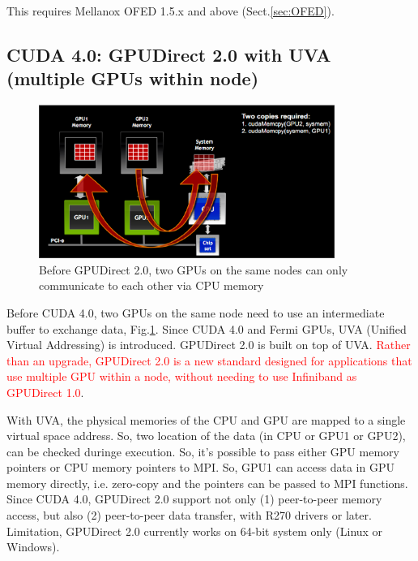 This requires Mellanox OFED 1.5.x and above (Sect.\ref{sec:OFED}).

\subsection{CUDA 4.0: GPUDirect 2.0 with UVA (multiple GPUs within node)}
\label{sec:GPUs_GPUDirect2}
\label{sec:GPUDirect-v2}

\begin{figure}[hbt]
  \centerline{\includegraphics[height=5cm,
    angle=0]{./images/GPUDirect1.eps}}
\caption{Before GPUDirect 2.0, two GPUs on the same nodes can only communicate
to each other via CPU memory}
\label{fig:2GPU_communicate}
\end{figure}

Before CUDA 4.0, two GPUs on the same node need to use an intermediate buffer to
exchange data, Fig.\ref{fig:2GPU_communicate}. Since CUDA 4.0 and Fermi GPUs,
UVA (Unified Virtual Addressing) is introduced. GPUDirect 2.0 is built on top of UVA.
\textcolor{red}{Rather than an upgrade, GPUDirect 2.0 is a new standard designed
for applications that use multiple GPU within a node, without needing to use
Infiniband as GPUDirect 1.0}. 

With UVA, the physical memories of the CPU and GPU are mapped to a single
virtual space address. So, two location of the data (in CPU or GPU1 or GPU2),
can be checked duringe execution. So, it's possible to pass either GPU memory
pointers or CPU memory pointers to MPI. So, GPU1 can access data in GPU memory
directly, i.e. zero-copy and the pointers can be passed to MPI functions. Since
CUDA 4.0, GPUDirect 2.0 support not only (1) peer-to-peer memory access, but
also (2) peer-to-peer data transfer, with R270 drivers or later. Limitation,
GPUDirect 2.0 currently works on 64-bit system only (Linux or Windows).

